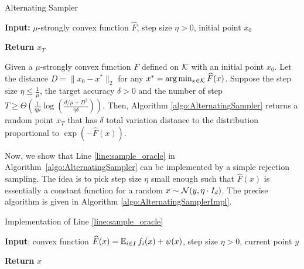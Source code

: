 \begin{algorithm2e}
\caption{Alternating Sampler \label{algo:AlternatingSampler}}

\textbf{Input:} $\mu$-strongly convex function $\widehat{F}$, step size $\eta>0$, initial
point $x_{0}$


\textbf{Return} $x_{T}$

\end{algorithm2e}
\begin{theorem}
\label{thm:alternating_sampler}Given a $\mu$-strongly convex function
$F$ defined on $\mathcal K$ with an initial point $x_{0}$. Let the distance $D=\|x_{0}-x^{*}\|_{2}$
for any $x^{*}=\arg\min_{x \in \mathcal K}\widehat{F}(x)$. Suppose the step size $\eta\leq\frac{1}{\mu}$,
the target accuracy $\delta>0$ and the number of step $T\geq\Theta(\frac{1}{\eta\mu}\log(\frac{d/\mu+D^{2}}{\eta\delta}))$.
Then, Algorithm \ref{algo:AlternatingSampler} returns a random point
$x_{T}$ that has $\delta$ total variation distance to the distribution proportional to $\exp(-\widehat{F}(x))$.
\end{theorem}

Now, we show that Line \ref{line:sample_oracle} in Algorithm~\ref{algo:AlternatingSampler} can be implemented
by a simple rejection sampling. The idea is to pick step size $\eta$
small enough such that $\widehat{F}(x)$ is essentially a constant function
for a random $x\sim \mathcal N(y,\eta\cdot I_{d})$. The precise algorithm
is given in Algorithm \ref{algo:AlternatingSamplerImpl}.

\begin{algorithm2e}

\caption{Implementation of Line \ref{line:sample_oracle} \label{algo:AlternatingSamplerImpl}}

\textbf{Input}: convex function $\widehat{F}(x)=\operatorname*{\mathbb{E}}_{i\in I}f_{i}(x)+ \psi(x)$,
step size $\eta>0$, current point $y$


\textbf{Return} $x$

\end{algorithm2e}

